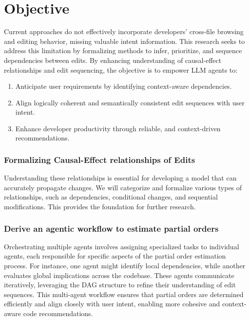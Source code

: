 \newpage
\section{Objective}

Current approaches do not effectively incorporate developers’ cross-file browsing and editing behavior, missing valuable intent information. This research seeks to address this limitation by formalizing methods to infer, prioritize, and sequence dependencies between edits. By enhancing understanding of causal-effect relationships and edit sequencing, the objective is to empower LLM agents to:

\begin{enumerate}
    \item Anticipate user requirements by identifying context-aware dependencies.
    \item Align logically coherent and semantically consistent edit sequences with user intent.
    \item Enhance developer productivity through reliable, and context-driven recommendations.
\end{enumerate}



\subsubsection{Formalizing Causal-Effect relationships of Edits}

Understanding these relationships is essential for developing a model that can accurately propagate changes. We will categorize and formalize various types of relationships, such as dependencies, conditional changes, and sequential modifications. This provides the foundation for further research.

\subsubsection{Derive an agentic workflow to estimate partial orders}

Orchestrating multiple agents involves assigning specialized tasks to individual agents, each responsible for specific aspects of the partial order estimation process. For instance, one agent might identify local dependencies, while another evaluates global implications across the codebase. These agents communicate iteratively, leveraging the DAG structure to refine their understanding of edit sequences. This multi-agent workflow ensures that partial orders are determined efficiently and align closely with user intent, enabling more cohesive and context-aware code recommendations.



